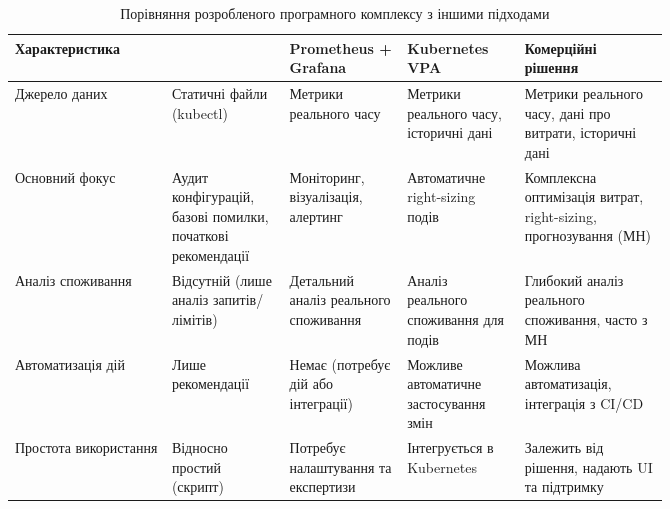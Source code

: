 \begin{table}[h!]
	\centering
	\caption{Порівняння розробленого програмного комплексу з іншими підходами}
	\label{tab:comparison}
	\footnotesize
	\begin{tabular}{@{}l >{\raggedright\arraybackslash}p{0.18\linewidth} >{\raggedright\arraybackslash}p{0.18\linewidth} >{\raggedright\arraybackslash}p{0.18\linewidth} >{\raggedright\arraybackslash}p{0.22\linewidth}@{}}
		\toprule
		\textbf{Характеристика} & \makecell[l]{\textbf{РПК}} & \makecell[l]{\textbf{Prometheus +}\\\textbf{Grafana}} & \makecell[l]{\textbf{Kubernetes}\\\textbf{VPA}} & \makecell[l]{\textbf{Комерційні}\\\textbf{рішення}} \\ 
		\midrule
		Джерело даних & Статичні файли (kubectl) & Метрики реального часу & Метрики реального часу, історичні дані & Метрики реального часу, дані про витрати, історичні дані \\
		\addlinespace
		Основний фокус & Аудит конфігурацій, базові помилки, початкові рекомендації & Моніторинг, візуалізація, алертинг & Автоматичне right-sizing подів & Комплексна оптимізація витрат, right-sizing, прогнозування (МН) \\
		\addlinespace
		Аналіз споживання & Відсутній (лише аналіз запитів/лімітів) & Детальний аналіз реального споживання & Аналіз реального споживання для подів & Глибокий аналіз реального споживання, часто з МН \\
		\addlinespace
		Автоматизація дій & Лише рекомендації & Немає (потребує дій або інтеграції) & Можливе автоматичне застосування змін & Можлива автоматизація, інтеграція з CI/CD \\
		\addlinespace
		Простота використання & Відносно простий (скрипт) & Потребує налаштування та експертизи & Інтегрується в Kubernetes & Залежить від рішення, надають UI та підтримку \\
		\bottomrule
	\end{tabular}
\end{table}


